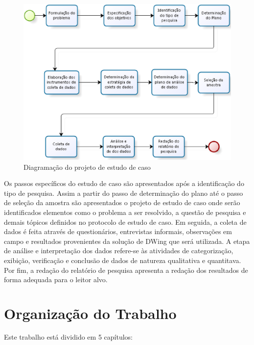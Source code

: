 \begin{figure}[h!]
\centering
\includegraphics[keepaspectratio=false,scale=0.65]{figuras/figuras_pedro/projeto-pesq.eps}
\caption{Diagramação do projeto de estudo de caso}
\label{fig:projeto-pesq}
\end{figure}
\FloatBarrier


Os passos específicos do estudo de caso são apresentados após a identificação do tipo de pesquisa. Assim a partir do passo de determinação do plano até o passo de seleção da amostra são apresentados o projeto de estudo de caso onde serão identificados elementos como o problema a ser resolvido, a questão de pesquisa e demais tópicos definidos no protocolo de estudo de caso. Em seguida, a coleta de dados é feita através de questionários, entrevistas informais, observações em campo e resultados provenientes da solução de DWing que será utilizada. A etapa de análise e interpretação dos dados  refere-se às atividades de categorização, exibição, verificação e conclusão de dados de natureza qualitativa e quantitava. Por fim, a redação do relatório de pesquisa apresenta a redação dos resultados de forma adequada para o leitor alvo.



\section{Organização do Trabalho}

Este trabalho está dividido em 5 capítulos:

